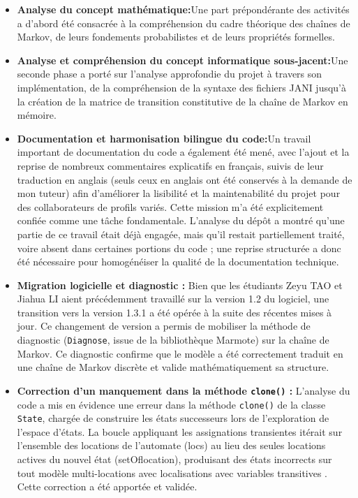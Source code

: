 \documentclass[14pt, a4paper]{extarticle}
\begin{document}
\begin{itemize}
  \item \textbf{Analyse du concept mathématique:}Une part prépondérante des activités a d'abord été consacrée à la compréhension du cadre théorique des chaînes de Markov, de leurs fondements probabilistes et de leurs propriétés formelles.
  \item \textbf{Analyse et compréhension du concept informatique sous-jacent:}Une seconde phase a porté sur l'analyse approfondie du projet à travers son implémentation, de la compréhension de la syntaxe des fichiers JANI jusqu'à la création de la matrice de transition constitutive de la chaîne de Markov en mémoire.
  \item \textbf{Documentation et harmonisation bilingue du code:}Un travail important de documentation du code a également été mené, avec l'ajout et la reprise de nombreux commentaires explicatifs en français, suivis de leur traduction en anglais (seuls ceux en anglais ont été conservés à la demande de mon tuteur) afin d'améliorer la lisibilité et la maintenabilité du projet pour des collaborateurs de profils variés. Cette mission m'a été explicitement confiée comme une tâche fondamentale. L'analyse du dépôt a montré qu'une partie de ce travail était déjà engagée, mais qu'il restait partiellement traité, voire absent dans certaines portions du code ; une reprise structurée a donc été nécessaire pour homogénéiser la qualité de la documentation technique.
  \item \textbf{Migration logicielle et diagnostic :} Bien que les étudiants Zeyu TAO et Jiahua LI aient précédemment travaillé sur la version 1.2 du logiciel, une transition vers la version 1.3.1 a été opérée à la suite des récentes mises à jour. Ce changement de version a permis de mobiliser la méthode de diagnostic (\texttt{Diagnose}, issue de la bibliothèque Marmote) sur la chaîne de Markov. Ce diagnostic confirme que le modèle a été correctement traduit en une chaîne de Markov discrète et valide mathématiquement sa structure.
  \item \textbf{Correction d'un manquement dans la méthode \texttt{clone()} :} L'analyse du code a mis en évidence une erreur dans la méthode \texttt{clone()} de la classe \texttt{State}, chargée de construire les états successeurs lors de l'exploration de l'espace d'états. La boucle appliquant les assignations transientes itérait sur l'ensemble des locations de l'automate (locs) au lieu des seules locations actives du nouvel état (setOflocation), produisant des états incorrects sur tout modèle multi-locations avec localisations avec variables transitives . Cette correction a été apportée et validée.

\end{itemize}
\end{document}
